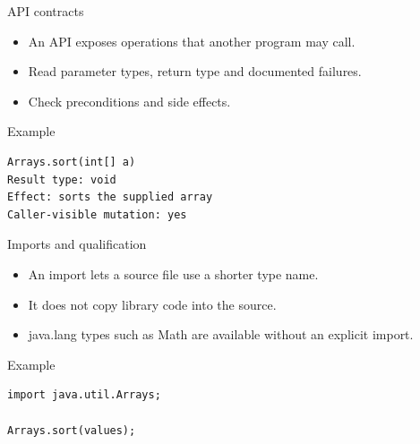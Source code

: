 \documentclass[10pt,aspectratio=169]{beamer}
\begin{document}
\begin{frame}[fragile,t]{API contracts}
\begin{itemize}
\item An API exposes operations that another program may call.
\item Read parameter types, return type and documented failures.
\item Check preconditions and side effects.
\end{itemize}
\vspace{1mm}\begin{block}{Example}
\begin{lstlisting}
Arrays.sort(int[] a)
Result type: void
Effect: sorts the supplied array
Caller-visible mutation: yes
\end{lstlisting}
\end{block}
\end{frame}

\begin{frame}[fragile,t]{Imports and qualification}
\begin{itemize}
\item An import lets a source file use a shorter type name.
\item It does not copy library code into the source.
\item java.lang types such as Math are available without an explicit import.
\end{itemize}
\vspace{1mm}\begin{block}{Example}
\begin{lstlisting}
import java.util.Arrays;

Arrays.sort(values);
\end{lstlisting}
\end{block}
\end{frame}
\end{document}
